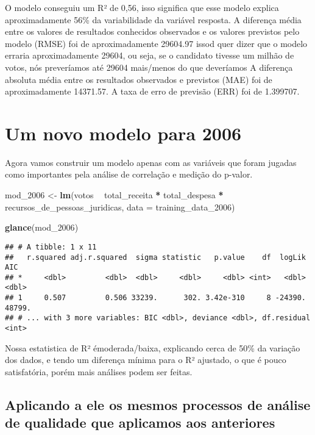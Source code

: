 \documentclass[]{article}
\newenvironment{Shaded}{\begin{snugshade}}{\end{snugshade}}
\newcommand{\KeywordTok}[1]{\textcolor[rgb]{0.13,0.29,0.53}{\textbf{#1}}}
\newcommand{\DataTypeTok}[1]{\textcolor[rgb]{0.13,0.29,0.53}{#1}}
\newcommand{\DecValTok}[1]{\textcolor[rgb]{0.00,0.00,0.81}{#1}}
\newcommand{\StringTok}[1]{\textcolor[rgb]{0.31,0.60,0.02}{#1}}
\newcommand{\OperatorTok}[1]{\textcolor[rgb]{0.81,0.36,0.00}{\textbf{#1}}}
\newcommand{\NormalTok}[1]{#1}
\begin{document}
O modelo conseguiu um R² de 0,56, isso significa que esse modelo explica
aproximadamente 56\% da variabilidade da variável resposta. A diferença
média entre os valores de resultados conhecidos observados e os valores
previstos pelo modelo (RMSE) foi de aproximadamente 29604.97 issod quer
dizer que o modelo erraria aproximadamente 29604, ou seja, se o
candidato tivesse um milhão de votos, nós preveríamos até 29604
mais/menos do que deveríamos A diferença absoluta média entre os
resultados observados e previstos (MAE) foi de aproximadamente 14371.57.
A taxa de erro de previsão (ERR) foi de 1.399707.

\section{Um novo modelo para 2006}\label{um-novo-modelo-para-2006}

Agora vamos construir um modelo apenas com as variáveis que foram
jugadas como importantes pela análise de correlação e medição do
p-valor.

\begin{Shaded}
\begin{Highlighting}[]
\NormalTok{mod_}\DecValTok{2006}\NormalTok{ <-}\StringTok{ }\KeywordTok{lm}\NormalTok{(votos }\OperatorTok{~}\StringTok{ }\NormalTok{total_receita }\OperatorTok{*}\StringTok{ }\NormalTok{total_despesa }\OperatorTok{*}\StringTok{ }\NormalTok{recursos_de_pessoas_juridicas,}
          \DataTypeTok{data =}\NormalTok{ training_data_}\DecValTok{2006}\NormalTok{)}

\KeywordTok{glance}\NormalTok{(mod_}\DecValTok{2006}\NormalTok{)}
\end{Highlighting}
\end{Shaded}

\begin{verbatim}
## # A tibble: 1 x 11
##   r.squared adj.r.squared  sigma statistic   p.value    df  logLik    AIC
## *     <dbl>         <dbl>  <dbl>     <dbl>     <dbl> <int>   <dbl>  <dbl>
## 1     0.507         0.506 33239.      302. 3.42e-310     8 -24390. 48799.
## # ... with 3 more variables: BIC <dbl>, deviance <dbl>, df.residual <int>
\end{verbatim}

Nossa estatistica de R² émoderada/baixa, explicando cerca de 50\% da
variação dos dados, e tendo um diferença mínima para o R² ajustado, o
que é pouco satisfatória, porém mais análises podem ser feitas.

\subsection{Aplicando a ele os mesmos processos de análise de qualidade
que aplicamos aos
anteriores}\label{aplicando-a-ele-os-mesmos-processos-de-analise-de-qualidade-que-aplicamos-aos-anteriores}
\end{document}
